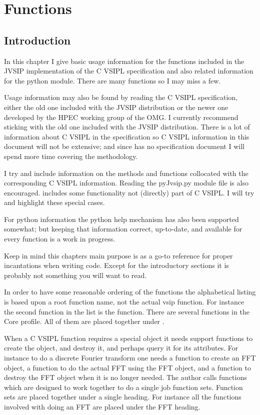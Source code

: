 \chapter{Functions}
\section*{Introduction}
In this chapter I give basic usage information for the functions included in the JVSIP implementation of the C VSIPL specification and also related information for the \pyjv python module.  There are many functions so I may miss a few.

Usage information may also be found by reading the C VSIPL specification, either the old one included with the JVSIP distribution or the newer one developed by the HPEC working group of the OMG.  I currently recommend sticking with the old one included with the JVSIP distribution.  There is a lot of information about C VSIPL in the specification so C VSIPL information in this document will not be extensive; and since \pyjv has no specification document I will spend more time covering the \pyjv methodology.

I try and include information on the \pyjv methods and functions collocated with the corresponding C VSIPL information.  Reading the pyJvsip.py module file is also encouraged.   includes some functionality not (directly) part of C VSIPL.  I will try and highlight these special cases.  

For python information the python help mechanism has also been supported somewhat; but keeping that information correct, up-to-date, and available for every function is a work in progress. 

Keep in mind this chapters main purpose is as a go-to reference for proper incantations when writing code. Except for the introductory sections it is probably not something you will want to read.

In order to have some reasonable ordering of the functions the alphabetical listing is based upon a root function name, not the actual vsip function. For instance the second function in the list is the  function. There are several  functions in the Core profile. All of them are placed together under .

When a C VSIPL function requires a special object it needs support functions to create the object, and destroy it, and perhaps query it for its attributes. For instance to do a discrete Fourier transform one needs a function to create an FFT object, a function to do the actual FFT using the FFT object, and a function to destroy the FFT object when it is no longer needed. The author calls functions which are designed to work together to do a single job function sets. Function sets are placed together under a single heading. For instance all the functions involved with doing an FFT are placed under the FFT heading.


